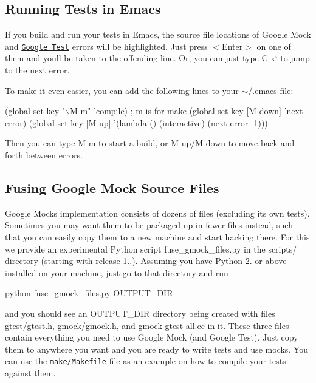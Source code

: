 \subsection*{Running Tests in Emacs}

If you build and run your tests in Emacs, the source file locations of Google Mock and \href{../../googletest/}{\tt Google Test} errors will be highlighted. Just press {\ttfamily $<$Enter$>$} on one of them and you\textquotesingle{}ll be taken to the offending line. Or, you can just type {\ttfamily C-\/x}` to jump to the next error.

To make it even easier, you can add the following lines to your {\ttfamily $\sim$/.emacs} file\+:


\begin{DoxyCode}
(global-set-key "\(\backslash\)M-m"   'compile)  ; m is for make
(global-set-key [M-down] 'next-error)
(global-set-key [M-up]   '(lambda () (interactive) (next-error -1)))
\end{DoxyCode}


Then you can type {\ttfamily M-\/m} to start a build, or {\ttfamily M-\/up}/{\ttfamily M-\/down} to move back and forth between errors.

\subsection*{Fusing Google Mock Source Files}

Google Mock\textquotesingle{}s implementation consists of dozens of files (excluding its own tests). Sometimes you may want them to be packaged up in fewer files instead, such that you can easily copy them to a new machine and start hacking there. For this we provide an experimental Python script {\ttfamily fuse\+\_\+gmock\+\_\+files.\+py} in the {\ttfamily scripts/} directory (starting with release 1..). Assuming you have Python 2. or above installed on your machine, just go to that directory and run 
\begin{DoxyCode}
python fuse\_gmock\_files.py OUTPUT\_DIR
\end{DoxyCode}


and you should see an {\ttfamily O\+U\+T\+P\+U\+T\+\_\+\+D\+IR} directory being created with files {\ttfamily \hyperlink{gtest_8h_source}{gtest/gtest.\+h}}, {\ttfamily \hyperlink{gmock_8h_source}{gmock/gmock.\+h}}, and {\ttfamily gmock-\/gtest-\/all.\+cc} in it. These three files contain everything you need to use Google Mock (and Google Test). Just copy them to anywhere you want and you are ready to write tests and use mocks. You can use the \href{../make/Makefile}{\tt make/\+Makefile} file as an example on how to compile your tests against them.


